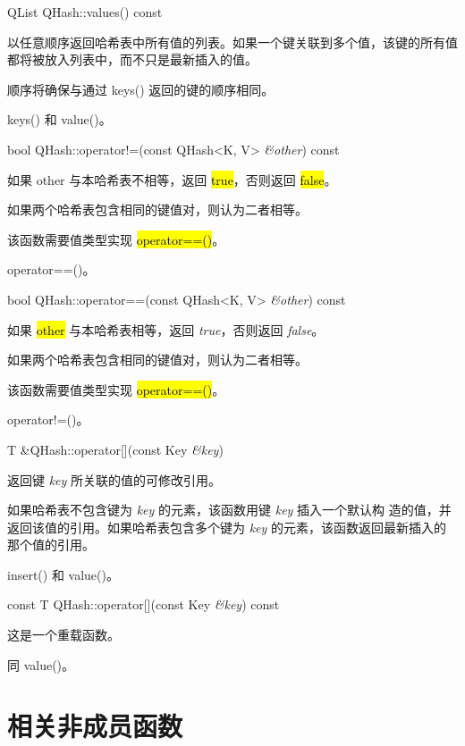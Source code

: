 QList QHash::values() const

以任意顺序返回哈希表中所有值的列表。如果一个键关联到多个值，该键的所有值都将被放入列表中，而不只是最新插入的值。

顺序将确保与通过 keys() 返回的键的顺序相同。

\begin{seeAlso}
keys() 和 value()。
\end{seeAlso}



bool QHash::operator!=(const QHash<K, V> \emph{\&other}) const

如果 other 与本哈希表不相等，返回 \hl{true}，否则返回 \hl{false}。

如果两个哈希表包含相同的键值对，则认为二者相等。

该函数需要值类型实现 \hl{operator==()}。

\begin{seeAlso}
operator==()。
\end{seeAlso}


bool QHash::operator==(const QHash<K, V> \emph{\&other}) const

如果 \hl{other} 与本哈希表相等，返回 \emph{true}，否则返回 \emph{false}。

如果两个哈希表包含相同的键值对，则认为二者相等。

该函数需要值类型实现 \hl{operator==()}。

\begin{seeAlso}
operator!=()。
\end{seeAlso}

T \&QHash::operator[](const Key \emph{\&key})

返回键 \emph{key} 所关联的值的可修改引用。

如果哈希表不包含键为 \emph{key} 的元素，该函数用键 \emph{key} 插入一个默认构
造的值，并返回该值的引用。如果哈希表包含多个键为 \emph{key} 的元素，该函数返回最新插入的那个值的引用。

\begin{seeAlso}
insert() 和 value()。
\end{seeAlso}


const T QHash::operator[](const Key \emph{\&key}) const

这是一个重载函数。

同 value()。

\section{相关非成员函数}


